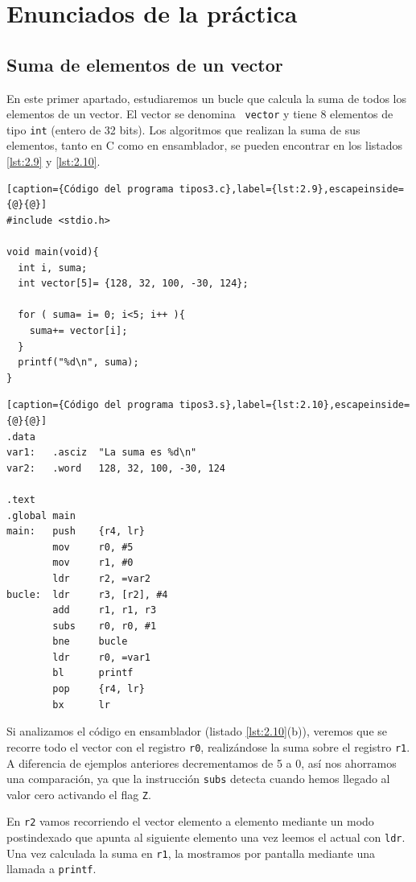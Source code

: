 \section{Enunciados de la práctica}


\subsection{Suma de elementos de un vector}

En este primer apartado, estudiaremos un bucle que calcula la suma de
todos los elementos de un vector. El vector se denomina {\tt
vector} y tiene 8 elementos de tipo {\tt int} (entero de 32 bits). Los algoritmos
que realizan la suma de sus elementos, tanto en C como en ensamblador, se
pueden encontrar en los listados \ref{lst:2.9} y \ref{lst:2.10}.

\begin{lstlisting}[caption={Código del programa tipos3.c},label={lst:2.9},escapeinside={@}{@}]
#include <stdio.h>

void main(void){
  int i, suma;
  int vector[5]= {128, 32, 100, -30, 124};

  for ( suma= i= 0; i<5; i++ ){
    suma+= vector[i];
  }
  printf("%d\n", suma);
}
\end{lstlisting}

\begin{lstlisting}[caption={Código del programa tipos3.s},label={lst:2.10},escapeinside={@}{@}]
.data
var1:   .asciz  "La suma es %d\n"
var2:   .word   128, 32, 100, -30, 124

.text
.global main
main:   push    {r4, lr}
        mov     r0, #5
        mov     r1, #0
        ldr     r2, =var2
bucle:  ldr     r3, [r2], #4
        add     r1, r1, r3
        subs    r0, r0, #1
        bne     bucle
        ldr     r0, =var1
        bl      printf
        pop     {r4, lr}
        bx      lr
\end{lstlisting}

Si analizamos el código en ensamblador (listado \ref{lst:2.10}(b)), veremos que se
recorre todo el vector con el registro {\tt r0}, realizándose la suma sobre el
registro {\tt r1}. A diferencia de ejemplos anteriores decrementamos de 5 a 0, así
nos ahorramos una comparación, ya que la instrucción {\tt subs} detecta cuando hemos
llegado al valor cero activando el flag {\tt Z}.

En {\tt r2} vamos recorriendo el vector elemento a elemento mediante un modo postindexado
que apunta al siguiente elemento una vez leemos el actual con {\tt ldr}. Una vez calculada
la suma en {\tt r1}, la mostramos por pantalla mediante una llamada a {\tt printf}.

